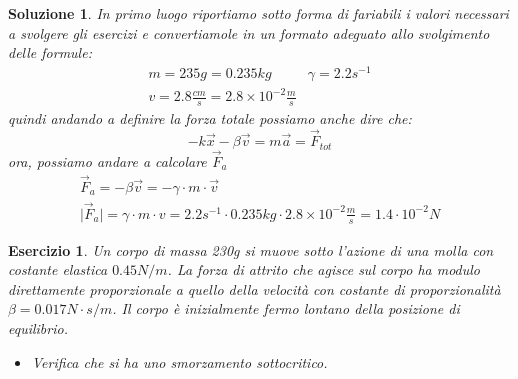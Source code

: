 \documentclass{article}
\newcommand{\abs}[1]{\lvert#1\rvert}
\newtheorem{es}{Esercizio}[section]
\newtheorem{sol}{Soluzione}[section]
\begin{document}
\begin{sol}
  In primo luogo riportiamo sotto forma di fariabili i valori necessari a svolgere gli esercizi e convertiamole in un formato adeguato allo svolgimento delle formule:
  \begin{eqnarray*}
    m=235g=0.235kg & \gamma=2.2s^{-1}\\
    v=2.8\frac{cm}{s}=2.8\times 10^{-2}\frac{m}{s}
  \end{eqnarray*}
  quindi andando a definire la forza totale possiamo anche dire che:
  \begin{equation*}
    -k\vec{x}-\beta \vec{v}=m\vec{a}=\vec{F}_{tot}
  \end{equation*}
  ora, possiamo andare a calcolare $\vec{F}_a$
  \begin{eqnarray*}
    \vec{F}_a=-\beta\vec{v}=-\gamma\cdot m\cdot \vec{v}\\
    \abs{\vec{F}_a}=\gamma\cdot m\cdot v= 2.2 s^{-1}\cdot 0.235kg\cdot2.8\times 10^{-2}\frac{m}{s}=1.4\cdot 10^{-2}N
  \end{eqnarray*}
\end{sol}
\begin{es}
  Un corpo di massa 230g si muove sotto l'azione di una molla con costante elastica $0.45N/m$. La forza di attrito che agisce sul corpo ha modulo direttamente proporzionale a quello della velocità con costante di proporzionalità $\beta=0.017N\cdot s/m$. Il corpo è inizialmente fermo lontano della posizione di equilibrio.
  \begin{itemize}
  \item Verifica che si ha uno smorzamento sottocritico.
  \end{itemize}
\end{es}
\end{document}
